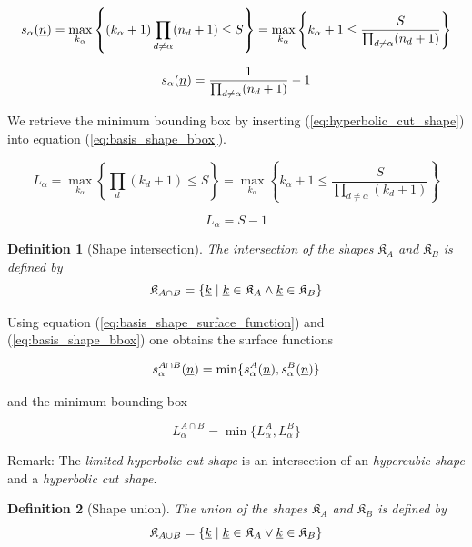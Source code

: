 \documentclass{article}
\newtheorem*{definition}{Definition}
\begin{document}
\[
  s_{\alpha}(\underline{n})=
  \max_{k_{\alpha}}\left\{(k_{\alpha}+1)\prod_{d \neq \alpha} (n_d+1) \leq S \right\} =
  \max_{k_{\alpha}}\left\{k_{\alpha}+1 \leq \frac{S}{\prod_{d \neq \alpha}(n_d+1)}\right\}
\]

\begin{equation}
s_{\alpha}(\underline{n})=\frac{1}{\prod_{d \neq \alpha} (n_d+1)}-1
\end{equation}

We retrieve the minimum bounding box by inserting (\ref{eq:hyperbolic_cut_shape}) into
equation (\ref{eq:basis_shape_bbox}).

\[
  L_{\alpha}=\max_{k_{\alpha}}\left\{\prod_d(k_d+1) \leq S\right\} =
  \max_{k_{\alpha}}\left\{k_{\alpha}+1 \leq \frac{S}{\prod_{d \neq \alpha}(k_d+1)}\right\}
\]

\begin{equation}
L_{\alpha}=S-1
\end{equation}

\begin{definition}[Shape intersection]
  The intersection of the shapes \(\mathfrak{K}_{A}\) and \(\mathfrak{K}_{B}\) is defined by
  \begin{equation}
    \label{eq:basis_shape_intersection}
    \mathfrak{K}_{A \cap B}=\left\{\underline{k} \;|\; \underline{k} \in \mathfrak{K}_A \land
      \underline{k} \in \mathfrak{K}_B
    \right\}
  \end{equation}
\end{definition}

Using equation (\ref{eq:basis_shape_surface_function}) and (\ref{eq:basis_shape_bbox})
one obtains the surface functions

\begin{equation}
  s_{\alpha}^{A \cap B}(\underline{n}) = \min\{s_{\alpha}^A(\underline{n}), s_{\alpha}^B(\underline{n})\}
\end{equation}

and the minimum bounding box

\begin{equation}
  L_{\alpha}^{A \cap B} = \min\{L_{\alpha}^{A}, L_{\alpha}^{B}\}
\end{equation}

Remark: The \emph{limited hyperbolic cut shape} is an intersection of an
\emph{hypercubic shape} and a \emph{hyperbolic cut shape}.

\begin{definition}[Shape union]
  The union of the shapes \(\mathfrak{K}_{A}\) and \(\mathfrak{K}_{B}\) is defined by
  \begin{equation}
    \label{eq:basis_shape_intersection}
    \mathfrak{K}_{A \cup B}=\left\{\underline{k} \;|\; \underline{k} \in \mathfrak{K}_A \lor
      \underline{k} \in \mathfrak{K}_B
    \right\}
  \end{equation}
\end{definition}
\end{document}
